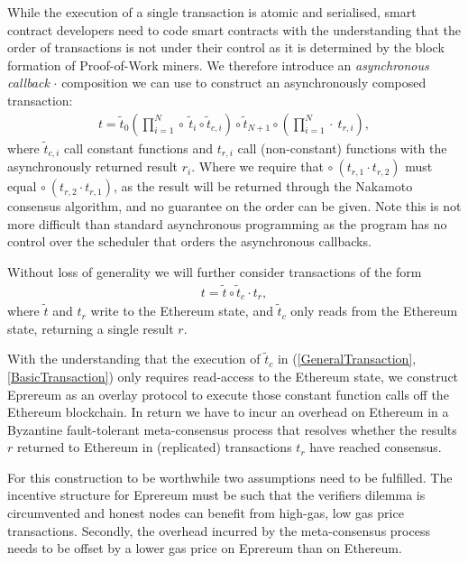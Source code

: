 \documentclass[twocolumn]{article}
\begin{document}
While the execution of a single transaction is atomic and serialised, smart contract developers need to code smart contracts with the understanding that the order of transactions is not under their control as it is determined by the block formation of Proof-of-Work miners.  We therefore introduce an \textit{asynchronous callback} $\cdot$ composition we can use to construct an asynchronously composed transaction:
\begin{align} \label{GeneralTransaction}
	t = \tilde{t}_0 \left(\prod_{i=1}^{N} \circ \ \tilde{t}_i \circ \tilde{t}_{c, i} \right) \circ \tilde{t}_{N+1} \circ \left(\prod_{i=1}^N \cdot \ t_{r, i}\right),
\end{align}
where $\tilde{t}_{c, i}$ call constant functions and $t_{r, i}$ call (non-constant) functions with the asynchronously returned result $r_i$.  Where we require that $\circ \ ( t_{r, 1} \cdot t_{r, 2} )$ must equal $\circ \ ( t_{r, 2} \cdot t_{r, 1} )$, as the result will be returned through the Nakamoto consensus algorithm, and no guarantee on the order can be given.  Note this is not more difficult than standard asynchronous programming as the program has no control over the scheduler that orders the asynchronous callbacks.

Without loss of generality we will further consider transactions of the form
\begin{align} \label{BasicTransaction}
	t = \tilde{t} \circ \tilde{t}_c \cdot t_r,
\end{align}
where $\tilde{t}$ and $t_r$ write to the Ethereum state, and $\tilde{t}_c$ only reads from the Ethereum state, returning a single result $r$.

With the understanding that the execution of $\tilde{t}_c$ in (\ref{GeneralTransaction}, \ref{BasicTransaction}) only requires read-access to the Ethereum state, we construct Eprereum as an overlay protocol to execute those constant function calls off the Ethereum blockchain.  In return we have to incur an overhead on Ethereum in a Byzantine fault-tolerant meta-consensus process that resolves whether the results $r$ returned to Ethereum in (replicated) transactions $t_r$ have reached consensus.

For this construction to be worthwhile two assumptions need to be fulfilled. The incentive structure for Eprereum must be such that the verifiers dilemma is circumvented and honest nodes can benefit from high-gas, low gas price transactions.  Secondly, the overhead incurred by the meta-consensus process needs to be offset by a lower gas price on Eprereum than on Ethereum.
\end{document}
